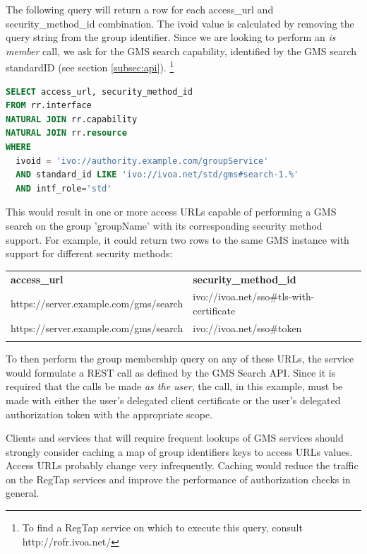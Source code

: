 \documentclass[11pt,a4paper]{ivoa}
\begin{document}
The following query will return a row for each access\_url and security\_method\_id combination.  The ivoid value is calculated by removing the query string from the group identifier.  Since we are looking to perform an \emph{is member} call, we ask for the GMS search capability, identified by the GMS search standardID (see section \ref{subsec:api}). \footnote{To find a RegTap service on which to execute this query, consult http://rofr.ivoa.net/}

\begin{lstlisting}[language=SQL,xleftmargin=2em]
SELECT access_url, security_method_id
FROM rr.interface
NATURAL JOIN rr.capability
NATURAL JOIN rr.resource
WHERE
  ivoid = 'ivo://authority.example.com/groupService'
  AND standard_id LIKE 'ivo://ivoa.net/std/gms#search-1.%'
  AND intf_role='std'
\end{lstlisting}

This would result in one or more access URLs capable of performing a GMS search on the group 'groupName' with its corresponding security method support.  For example, it could return two rows to the same GMS instance with support for different security methods:

\vspace{3mm}
\hskip-1.0cm
\begin{tabular}{l l}
\textbf{access\_url} & \textbf{security\_method\_id} \\
\sptablerule
https://server.example.com/gms/search & ivo://ivoa.net/sso\#tls-with-certificate \\
https://server.example.com/gms/search & ivo://ivoa.net/sso\#token \\
\sptablerule
\end{tabular}
\vspace{3mm}

To then perform the group membership query on any of these URLs, the service would formulate a REST call as defined by the GMS Search API.  Since it is required that the calls be made \emph{as the user}, the call, in this example, must be made with either the user's delegated client certificate or the user's delegated authorization token with the appropriate scope.

Clients and services that will require frequent lookups of GMS services should strongly consider caching a map of group identifiers keys to access URLs values. Access URLs probably change very infrequently.  Caching would reduce the traffic on the RegTap services and improve the performance of authorization checks in general. 
\end{document}
